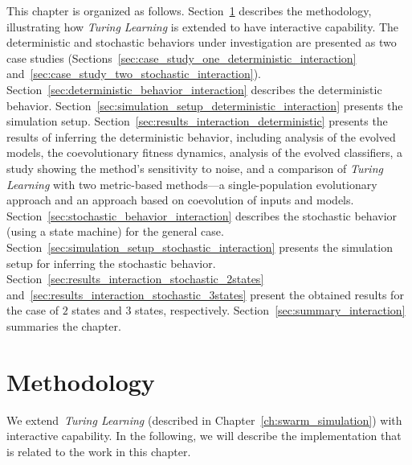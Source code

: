 This chapter is organized as follows. Section~\ref{sec:methodology_interaction} describes the methodology, illustrating how \textit{Turing Learning} is extended to have interactive capability. The deterministic and stochastic behaviors under investigation are presented as two case studies (Sections~\ref{sec:case_study_one_deterministic_interaction} and~\ref{sec:case_study_two_stochastic_interaction}). Section~\ref{sec:deterministic_behavior_interaction} describes the deterministic behavior. Section~\ref{sec:simulation_setup_deterministic_interaction} presents the simulation setup. Section~\ref{sec:results_interaction_deterministic} presents the results of inferring the deterministic behavior, including analysis of the evolved models, the coevolutionary fitness dynamics, analysis of the evolved classifiers, a study showing the method's sensitivity to noise, and a comparison of \textit{Turing Learning} with two metric-based methods---a single-population evolutionary approach and an approach based on coevolution of inputs and models. Section~\ref{sec:stochastic_behavior_interaction} describes the stochastic behavior (using a state machine) for the general case. Section~\ref{sec:simulation_setup_stochastic_interaction} presents the simulation setup for inferring the stochastic behavior. Section~\ref{sec:results_interaction_stochastic_2states} and~\ref{sec:results_interaction_stochastic_3states} present the obtained results for the case of $2$ states and $3$ states, respectively. Section~\ref{sec:summary_interaction} summaries the chapter.

\section{Methodology}\label{sec:methodology_interaction}

We extend~\textit{Turing Learning} (described in Chapter~\ref{ch:swarm_simulation}) with interactive capability. In the following, we will describe the implementation that is related to the work in this chapter.

